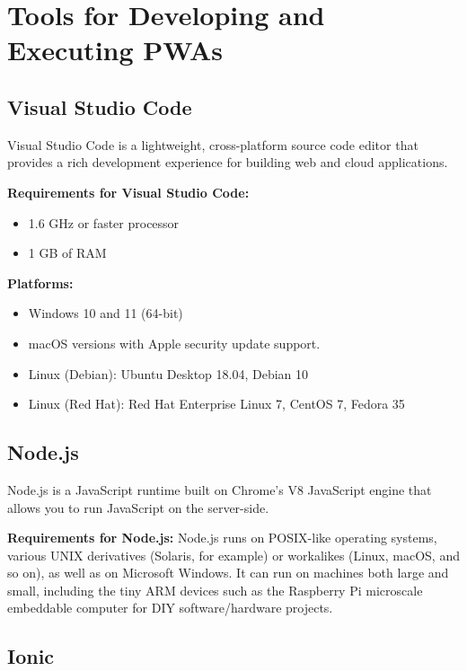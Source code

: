 \documentclass{IEEEtran}
\begin{document}
	\section{Tools for Developing and Executing PWAs}
	
	\subsection{Visual Studio Code}
	
	Visual Studio Code is a lightweight, cross-platform source code editor that provides a rich development experience for building web and cloud applications.
	
	\textbf{Requirements for Visual Studio Code:}
	\begin{itemize}
		\item 1.6 GHz or faster processor
		\item 1 GB of RAM
	\end{itemize}
	
	\textbf{Platforms:}
	\begin{itemize}
		\item Windows 10 and 11 (64-bit)
		\item macOS versions with Apple security update support.
		\item Linux (Debian): Ubuntu Desktop 18.04, Debian 10
		\item Linux (Red Hat): Red Hat Enterprise Linux 7, CentOS 7, Fedora 35
	\end{itemize}
	
	\subsection{Node.js}
	
	Node.js is a JavaScript runtime built on Chrome’s V8 JavaScript engine that allows you to run JavaScript on the server-side.
	
	\textbf{Requirements for Node.js:}
	Node.js runs on POSIX-like operating systems, various UNIX derivatives (Solaris, for example) or workalikes (Linux, macOS, and so on), as well as on Microsoft Windows. It can run on machines both large and small, including the tiny ARM devices such as the Raspberry Pi microscale embeddable computer for DIY software/hardware projects.
	
	\subsection{Ionic}
	
\end{document}
